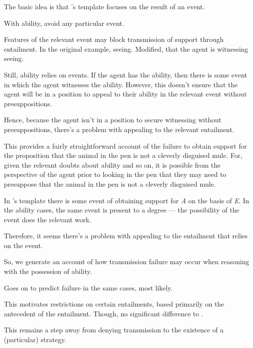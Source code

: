 \documentclass[10pt]{article}
\begin{document}
\begin{note}
  The basic idea is that \citeauthor{Wright:2016wl}'s template focuses on the result of an event.

  With ability, avoid any particular event.

  Features of the relevant event may block transmission of support through entailment.
  In the original example, seeing.
  Modified, that the agent is witnessing seeing.

  Still, ability relies on events.
  If the agent has the ability, then there is some event in which the agent witnesses the ability.
  However, this doesn't ensure that the agent will be in a position to appeal to their ability in the relevant event without presuppositions.

  Hence, because the agent isn't in a position to secure witnessing without presuppositions, there's a problem with appealing to the relevant entailment.

  This provides a fairly straightforward account of the failure to obtain support for the proposition that the animal in the pen is not a cleverly disguised mule.
  For, given the relevant doubts about ability and so on, it is possible from the perspective of the agent prior to looking in the pen that they may need to presuppose that the animal in the pen is not a cleverly disguised mule.

  In \citeauthor{Wright:2016wl}'s template there is some event of obtaining support for \emph{A} on the basis of \emph{E}.
  In the ability cases, the same event is present to a degree --- the possibility of the event does the relevant work.

  Therefore, it seems there's a problem with appealing to the entailment that relies on the event.

  So, we generate an account of how transmission failure may occur when reasoning with the possession of ability.

  Goes on to predict failure in the same cases, most likely.

  This motivates restrictions on certain entailments, based primarily on the antecedent of the entailment.
  Though, no significant difference to \citeauthor{Wright:2016wl}.

  This remains a step away from denying transmission to the existence of a (particular) strategy.
\end{note}
\end{document}
